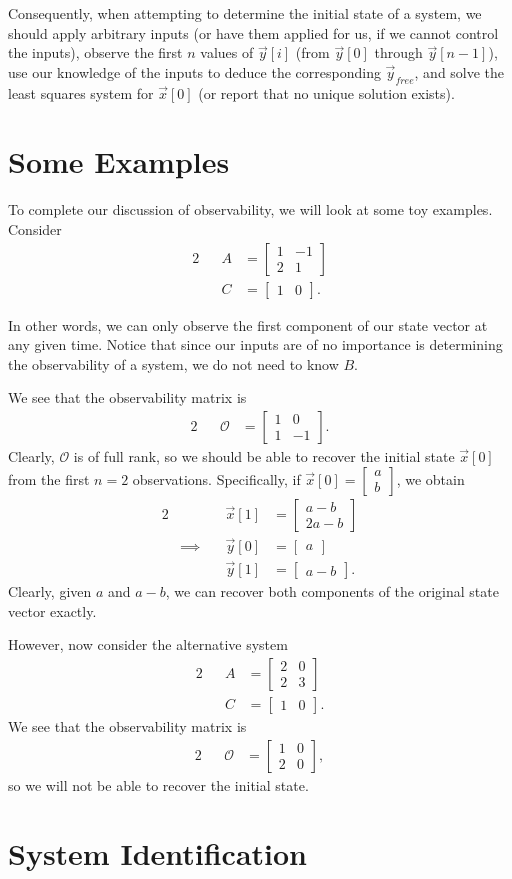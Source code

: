 \documentclass[letterpaper]{article}
\theoremstyle{remark}
\newcommand{\mat}[1]{\ensuremath{\begin{bmatrix}#1\end{bmatrix}}}
\newcommand{\eqn}[1]{\begin{alignat*}{2}#1\end{alignat*}}
\newcommand*{\thus}{&\implies\quad&}
\begin{document}
Consequently, when attempting to determine the initial state of a system, we should apply arbitrary inputs (or have them applied for us, if we cannot control the inputs), observe the first $n$ values of $\vec{y}[i]$ (from $\vec{y}[0]$ through $\vec{y}[n - 1]$), use our knowledge of the inputs to deduce the corresponding $\vec{y}_{free}$, and solve the least squares system for $\vec{x}[0]$ (or report that no unique solution exists).

\section{Some Examples}
To complete our discussion of observability, we will look at some toy examples. Consider
\eqn{
    && A &= \mat{1 & -1 \\ 2 & 1} \\
    && C &= \mat{1 & 0}.
}

In other words, we can only observe the first component of our state vector at any given time. Notice that since our inputs are of no importance is determining the observability of a system, we do not need to know $B$.

We see that the observability matrix is
\eqn{
    && \mathscr{O} &= \mat{1 & 0 \\ 1 & -1}.
}
Clearly, $\mathscr{O}$ is of full rank, so we should be able to recover the initial state $\vec{x}[0]$ from the first $n = 2$ observations. Specifically, if $\vec{x}[0] = \mat{a \\ b}$, we obtain
\eqn{
    && \vec{x}[1] &= \mat{a - b \\ 2a - b} \\
    \thus \vec{y}[0] &= \mat{a} \\
    && \vec{y}[1] &= \mat{a - b}.
}
Clearly, given $a$ and $a - b$, we can recover both components of the original state vector exactly.

However, now consider the alternative system
\eqn{
    && A &= \mat{2 & 0 \\ 2 & 3} \\
    && C &= \mat{1 & 0}.
}
We see that the observability matrix is
\eqn{
    && \mathscr{O} &= \mat{1 & 0 \\ 2 & 0},
}
so we will not be able to recover the initial state.


\section{System Identification}
\end{document}
